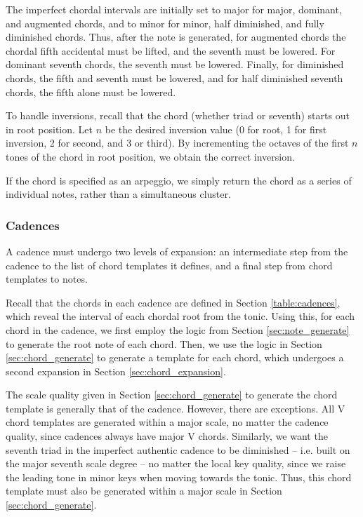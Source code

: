 \documentclass{article}
\begin{document}
The imperfect chordal intervals are initially set to major for major, dominant, and augmented chords, and to minor for minor, half diminished, and fully diminished chords. Thus, after the note is generated, for augmented chords the chordal fifth accidental must be lifted, and the seventh must be lowered. For dominant seventh chords, the seventh must be lowered. Finally, for diminished chords, the fifth and seventh must be lowered, and for half diminished seventh chords, the fifth alone must be lowered.

To handle inversions, recall that the chord (whether triad or seventh) starts out in root position. Let $n$ be the desired inversion value (0 for root, 1 for first inversion, 2 for second, and 3 or third). By incrementing the octaves of the first $n$ tones of the chord in root position, we obtain the correct inversion.

If the chord is specified as an arpeggio, we simply return the chord as a series of individual notes, rather than a simultaneous cluster.

\subsubsection{Cadences}
A cadence must undergo two levels of expansion: an intermediate step from the cadence to the list of chord templates it defines, and a final step from chord templates to notes.

Recall that the chords in each cadence are defined in Section \ref{table:cadences}, which reveal the interval of each chordal root from the tonic. Using this, for each chord in the cadence, we first employ the logic from Section \ref{sec:note_generate} to generate the root note of each chord. Then, we use the logic in Section \ref{sec:chord_generate} to generate a template for each chord, which undergoes a second expansion in Section \ref{sec:chord_expansion}.

The scale quality given in Section \ref{sec:chord_generate} to generate the chord template is generally that of the cadence. However, there are exceptions. All V chord templates are generated within a major scale, no matter the cadence quality, since cadences always have major V chords. Similarly, we want the seventh triad in the imperfect authentic cadence to be diminished – i.e. built on the major seventh scale degree – no matter the local key quality, since we raise the leading tone in minor keys when moving towards the tonic. Thus, this chord template must also be generated within a major scale in Section \ref{sec:chord_generate}.
\end{document}
